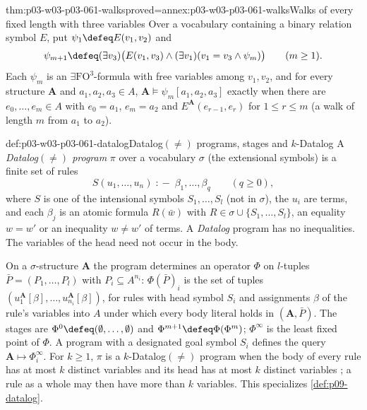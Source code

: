 \begin{hbtheorem}{thm:p03-w03-p03-061-walks}{proved=annex:p03-w03-p03-061-walks}{Walks of every fixed length with three variables}
Over a vocabulary containing a binary relation symbol \(E\), put
\(\psi_1\defeq E(v_1,v_2)\) and
\[
 \psi_{m+1}\defeq(\exists v_3)\bigl(E(v_1,v_3)\wedge(\exists v_1)(v_1=v_3
 \wedge\psi_m)\bigr)\qquad(m\ge1).
\]
Each \(\psi_m\) is an \(\exists\mathrm{FO}^3\)-formula with free variables
among \(v_1,v_2\), and for every structure \(\mathbf A\) and
\(a_1,a_2,a_3\in A\), \(\mathbf A\models\psi_m[a_1,a_2,a_3]\) exactly when
there are \(e_0,\ldots,e_m\in A\) with \(e_0=a_1\), \(e_m=a_2\) and
\(E^{\mathbf A}(e_{r-1},e_r)\) for \(1\le r\le m\) (a walk of length \(m\)
from \(a_1\) to \(a_2\)).
\end{hbtheorem}

\begin{hbdefinition}{def:p03-w03-p03-061-datalog}{Datalog\((\neq)\) programs, stages and \(k\)-Datalog}
A \emph{Datalog\((\neq)\) program} \(\pi\) over a vocabulary \(\sigma\)
(the extensional symbols) is a finite set of rules
\[
 S(u_1,\ldots,u_n)\;\mathrel{{:}\!-}\;\beta_1,\ldots,\beta_q\qquad(q\ge0),
\]
where \(S\) is one of the intensional symbols \(S_1,\ldots,S_l\) (not in
\(\sigma\)), the \(u_i\) are terms, and each \(\beta_j\) is an atomic formula
\(R(\bar w)\) with \(R\in\sigma\cup\{S_1,\ldots,S_l\}\), an equality
\(w=w'\) or an inequality \(w\neq w'\) of terms. A \emph{Datalog} program has
no inequalities. The variables of the head need not occur in the body.

On a \(\sigma\)-structure \(\mathbf A\) the program determines an operator
\(\Phi\) on \(l\)-tuples \(\bar P=(P_1,\ldots,P_l)\) with
\(P_i\subseteq A^{n_i}\): \(\Phi(\bar P)_i\) is the set of tuples
\((u_1^{\mathbf A}[\beta],\ldots,u_{n_i}^{\mathbf A}[\beta])\), for rules
with head symbol \(S_i\) and assignments \(\beta\) of the rule's variables
into \(A\) under which every body literal holds in \((\mathbf A,\bar P)\). The
stages are \(\Phi^0\defeq(\emptyset,\ldots,\emptyset)\) and
\(\Phi^{m+1}\defeq\Phi(\Phi^m)\); \(\Phi^\infty\) is the least fixed point of
\(\Phi\). A program with a designated goal symbol \(S_i\) defines the query
\(\mathbf A\mapsto\Phi^\infty_i\). For \(k\ge1\), \(\pi\) is a
\(k\)-Datalog\((\neq)\) program when the body of every rule has at most \(k\)
distinct variables and its head has at most \(k\) distinct variables
\cite[p.~70]{Kolaitis2003ExpressivePowerNotes}; a rule as a whole may then
have more than \(k\) variables. This specializes \cref{def:p09-datalog}.
\end{hbdefinition}

